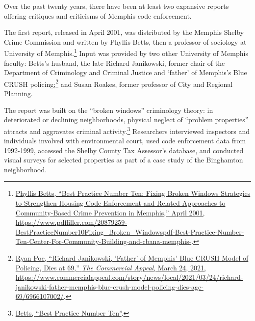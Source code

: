 \documentclass[
  openany]{book}
\begin{document}
Over the past twenty years, there have been at least two expansive reports offering critiques and criticisms of Memphis code enforcement.

The first report, released in April 2001, was distributed by the Memphis Shelby Crime Commission and written by Phyllis Betts, then a professor of sociology at University of Memphis.\footnote{\protect\hyperlink{ref-betts2001}{Phyllis Betts, {``Best Practice Number Ten: Fixing Broken Windows {{}} Strategies to Strengthen Housing Code Enforcement and Related Approaches to Community-Based Crime Prevention in Memphis,''} April 2001, \url{https://www.pdffiller.com/20879259-BestPracticeNumber10Fixing_Broken_Windowspdf-Best-Practice-Number-Ten-Center-For-Community-Building-and-cbana-memphis-}}.} Input was provided by two other University of Memphis faculty: Betts's husband, the late Richard Janikowski, former chair of the Department of Criminology and Criminal Justice and `father' of Memphis's Blue CRUSH policing;\footnote{\protect\hyperlink{ref-poe2021}{Ryan Poe, {``Richard Janikowski, 'Father' of Memphis' Blue CRUSH Model of Policing, Dies at 69,''} \emph{The Commercial Appeal}, March 24, 2021, \url{https://www.commercialappeal.com/story/news/local/2021/03/24/richard-janikowski-father-memphis-blue-crush-model-policing-dies-age-69/6966107002/}}.} and Susan Roakes, former professor of City and Regional Planning.

The report was built on the ``broken windows'' criminology theory: in deteriorated or declining neighborhoods, physical neglect of ``problem properties'' attracts and aggravates criminal activity.\footnote{\protect\hyperlink{ref-betts2001}{Betts, {``Best Practice Number Ten''}}.} Researchers interviewed inspectors and individuals involved with environmental court, used code enforcement data from 1992-1999, accessed the Shelby County Tax Assessor's database, and conducted visual surveys for selected properties as part of a case study of the Binghamton neighborhood.
\end{document}
